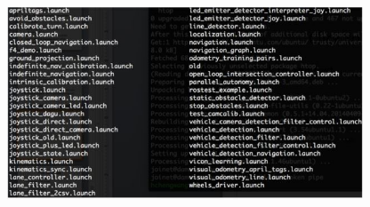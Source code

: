 \documentclass{article}
\begin{document}
\begin{figure}[htp]
    \begin{center}
        \includegraphics[width=300pt]{pic/圖片23.jpg}
    \end{center}
\end{figure}
\end{document}
